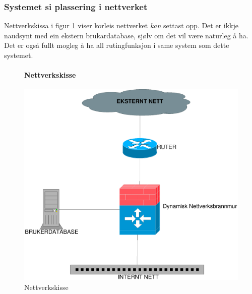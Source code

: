 \documentclass[nynorsk,12pt,a4paper]{article}
\begin{document}
\subsubsection{Systemet si plassering i nettverket}
Nettverkskissa i figur \ref{fig:nett} viser korleis nettverket \emph{kan} settast opp. Det er ikkje naudsynt med ein ekstern brukardatabase, sjølv om det vil være naturleg å ha. Det er også fullt mogleg å ha all rutingfunksjon i same system som dette systemet.
\begin{figure}[h!]
\paragraph{Nettverkskisse}
	\centering
	\includegraphics[scale=0.5]{imgs/nettverk.eps}
	\caption{Nettverkskisse}
	\label{fig:nett}
\end{figure}

\end{document}
